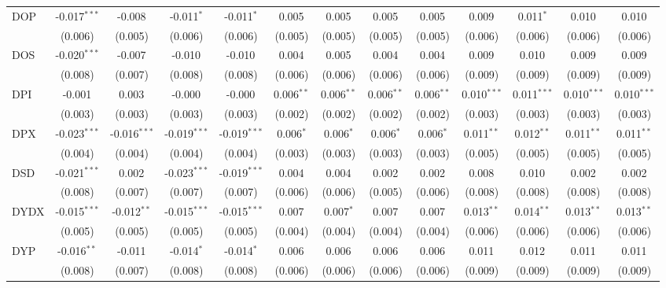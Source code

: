 \begin{table}[!htbp]
\begin{tabular}{@{\extracolsep{5pt}}lcccccccccccc}
 DOP & -0.017$^{***}$ & -0.008$^{}$ & -0.011$^{*}$ & -0.011$^{*}$ & 0.005$^{}$ & 0.005$^{}$ & 0.005$^{}$ & 0.005$^{}$ & 0.009$^{}$ & 0.011$^{*}$ & 0.010$^{}$ & 0.010$^{}$ \\
  & (0.006) & (0.005) & (0.006) & (0.006) & (0.005) & (0.005) & (0.005) & (0.005) & (0.006) & (0.006) & (0.006) & (0.006) \\
 DOS & -0.020$^{***}$ & -0.007$^{}$ & -0.010$^{}$ & -0.010$^{}$ & 0.004$^{}$ & 0.005$^{}$ & 0.004$^{}$ & 0.004$^{}$ & 0.009$^{}$ & 0.010$^{}$ & 0.009$^{}$ & 0.009$^{}$ \\
  & (0.008) & (0.007) & (0.008) & (0.008) & (0.006) & (0.006) & (0.006) & (0.006) & (0.009) & (0.009) & (0.009) & (0.009) \\
 DPI & -0.001$^{}$ & 0.003$^{}$ & -0.000$^{}$ & -0.000$^{}$ & 0.006$^{**}$ & 0.006$^{**}$ & 0.006$^{**}$ & 0.006$^{**}$ & 0.010$^{***}$ & 0.011$^{***}$ & 0.010$^{***}$ & 0.010$^{***}$ \\
  & (0.003) & (0.003) & (0.003) & (0.003) & (0.002) & (0.002) & (0.002) & (0.002) & (0.003) & (0.003) & (0.003) & (0.003) \\
 DPX & -0.023$^{***}$ & -0.016$^{***}$ & -0.019$^{***}$ & -0.019$^{***}$ & 0.006$^{*}$ & 0.006$^{*}$ & 0.006$^{*}$ & 0.006$^{*}$ & 0.011$^{**}$ & 0.012$^{**}$ & 0.011$^{**}$ & 0.011$^{**}$ \\
  & (0.004) & (0.004) & (0.004) & (0.004) & (0.003) & (0.003) & (0.003) & (0.003) & (0.005) & (0.005) & (0.005) & (0.005) \\
 DSD & -0.021$^{***}$ & 0.002$^{}$ & -0.023$^{***}$ & -0.019$^{***}$ & 0.004$^{}$ & 0.004$^{}$ & 0.002$^{}$ & 0.002$^{}$ & 0.008$^{}$ & 0.010$^{}$ & 0.002$^{}$ & 0.002$^{}$ \\
  & (0.008) & (0.007) & (0.007) & (0.007) & (0.006) & (0.006) & (0.005) & (0.006) & (0.008) & (0.008) & (0.008) & (0.008) \\
 DYDX & -0.015$^{***}$ & -0.012$^{**}$ & -0.015$^{***}$ & -0.015$^{***}$ & 0.007$^{}$ & 0.007$^{*}$ & 0.007$^{}$ & 0.007$^{}$ & 0.013$^{**}$ & 0.014$^{**}$ & 0.013$^{**}$ & 0.013$^{**}$ \\
  & (0.005) & (0.005) & (0.005) & (0.005) & (0.004) & (0.004) & (0.004) & (0.004) & (0.006) & (0.006) & (0.006) & (0.006) \\
 DYP & -0.016$^{**}$ & -0.011$^{}$ & -0.014$^{*}$ & -0.014$^{*}$ & 0.006$^{}$ & 0.006$^{}$ & 0.006$^{}$ & 0.006$^{}$ & 0.011$^{}$ & 0.012$^{}$ & 0.011$^{}$ & 0.011$^{}$ \\
  & (0.008) & (0.007) & (0.008) & (0.008) & (0.006) & (0.006) & (0.006) & (0.006) & (0.009) & (0.009) & (0.009) & (0.009) \\

\end{tabular}
\end{table}
